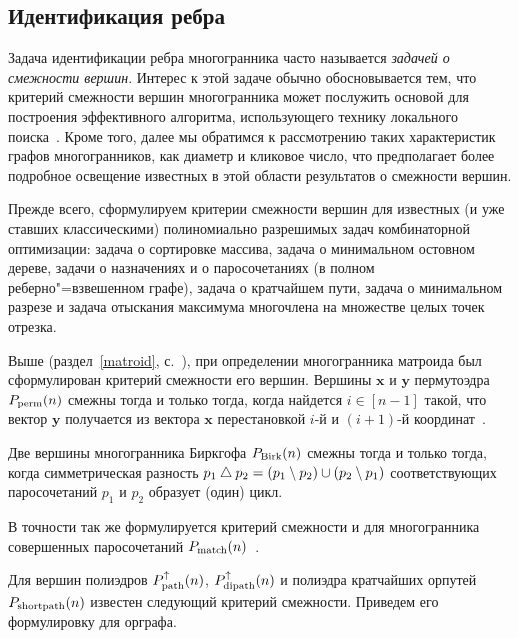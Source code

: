 \subsection{Идентификация ребра}

Задача идентификации ребра многогранника часто называется \emph{задачей о смежности вершин}.
Интерес к этой задаче обычно обосновывается тем, что критерий смежности вершин многогранника может послужить основой для построения эффективного алгоритма, использующего технику локального поиска~\cite{MatsuiTamura:1995}.
Кроме того, далее мы обратимся к рассмотрению таких характеристик графов многогранников, как диаметр и кликовое число, что предполагает более подробное освещение известных в этой области результатов о смежности вершин.

Прежде всего, сформулируем критерии смежности вершин для известных (и уже ставших классическими) полиномиально разрешимых задач комбинаторной оптимизации:
задача о сортировке массива, задача о минимальном остовном дереве, задачи о назначениях и о паросочетаниях (в полном реберно"=взвешенном графе), задача о кратчайшем пути, задача о минимальном разрезе и задача отыскания максимума многочлена на множестве целых точек отрезка.


Выше (раздел~\ref{matroid}, с.~\pageref{matroid}), при определении многогранника матроида был сформулирован критерий смежности его вершин.
Вершины $\bm{x}$ и $\bm{y}$ пермутоэдра $P_{\textup{perm}}(n)$ смежны тогда и только тогда, когда найдется $i\in[n-1]$ такой, что вектор $\bm{y}$
получается из вектора $\bm{x}$ перестановкой $i$-й и $(i+1)$-й координат~\cite{Emelichev:1981}.

\begin{lemma}
\label{lem:BirkAdj}
Две вершины многогранника Биркгофа $P_{\textup{Birk}}(n)$ смежны тогда и только тогда, когда симметрическая разность $p_1 \bigtriangleup p_2 = (p_1 \setminus p_2) \cup (p_2 \setminus p_1)$ соответствующих паросочетаний $p_1$ и $p_2$
образует (один) цикл.
\end{lemma}

В точности так же формулируется критерий смежности и для многогранника совершенных паросочетаний $P_{\textup{match}}(n)$~\cite{PadbergRao:1974, Chvatal:1975}.

Для вершин полиэдров $P_{\textup{path}}^{\uparrow}(n)$, $P_{\textup{dipath}}^{\uparrow}(n)$ и полиэдра кратчайших орпутей $P_{\textup{shortpath}}(n)$ известен следующий критерий смежности.
Приведем его формулировку для орграфа.

